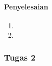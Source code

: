 \documentclass[a4paper,12pt]{article}
\begin{document}
\paragraph{Penyelesaian\\}
\begin{enumerate}[label=\alph*.]
	\item 
	\begin{minipage}[t]{\linewidth}
		\raggedright
	\end{minipage}
	\item 
	\begin{minipage}[t]{\linewidth}
		\raggedright
	\end{minipage}
\end{enumerate}

\subsubsection{Tugas 2}
\end{document}
